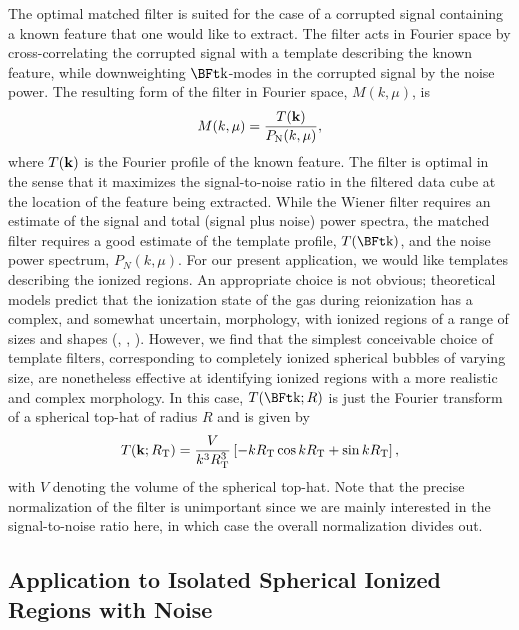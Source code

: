 The optimal matched filter is suited for the case of a corrupted 
signal containing a known feature that one would like to extract. The
filter acts in Fourier space by cross-correlating the corrupted signal
with a template describing the known feature, while 
downweighting $\k$-modes in the
corrupted signal by the noise power. The resulting form of the filter in
Fourier space,
$M(k, \mu)$, is 
\begin{equation} M(k,\mu) = \frac{T({\bf k})}{P_{\text{N}}(k,\mu)}, \label{eq:MatchedFilter} \end{equation}
where $T({\bf k})$ is the Fourier profile of the known feature. The
filter is optimal in the sense that it maximizes the signal-to-noise
ratio in the filtered data cube at the location of the feature being
extracted. While the Wiener filter requires an estimate of the signal and total (signal plus noise) power spectra,
the matched filter requires a good estimate of the template profile, $T(\k)$, and the noise power spectrum, $P_{N}(k,\mu)$. For our present application,
we would like templates describing the ionized regions.
An appropriate choice is not obvious; theoretical models predict that the
ionization state of the gas during reionization has a complex, and
somewhat uncertain, morphology, with ionized regions of a range of
sizes and shapes (\citealt{Iliev:2005sz}, \citealt{Zahn:2006sg},
\citealt{McQuinn:2006et}). However, we find that the simplest conceivable
choice of template filters, corresponding to completely ionized 
spherical bubbles of varying size, are nonetheless effective at
identifying ionized regions with a more realistic and complex
morphology. In this case, $T(\k;R)$ is just the Fourier transform
of a spherical top-hat of radius $R$ and is given by
\begin{equation} T({\bf k};R_{\text{T}}) = \frac{V}{k^3R_{\text{T}}^3}\left[ -kR_{\text{T}}\cos kR_{\text{T}} + \sin kR_{\text{T}} \right], \label{eq:Template} \end{equation}
with $V$ denoting the volume of the spherical top-hat. Note that the precise normalization of the filter is unimportant since
we are mainly interested in the signal-to-noise ratio here, in which case the overall normalization divides out.


\subsection{Application to Isolated Spherical Ionized Regions with Noise} \label{sec:Bubbletoy}


